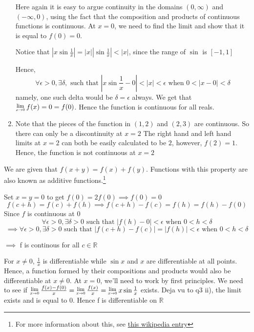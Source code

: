 \documentclass{article}
\newcommand{\Lim}[1]{\raisebox{0.5ex}{\scalebox{0.8}{$\displaystyle \lim_{#1}\;$}}}
\begin{document}
\begin{enumerate}
                            Here again it is easy to argue continuity in the domains $(0, \infty)$ and $(-\infty, 0)$, using the fact that the composition and products of continuous functions is continuous. At $x=0$, we need to find the limit and show that it is equal to $f(0) = 0$.


                            Notice that $|x\sin \frac{1}{x}| = |x||\sin \frac{1}{x}| < |x|$, since the range of $\sin$ is $[-1, 1]$

                            Hence,
                            $$\forall \epsilon>0, \exists \delta,  \text{ such that }|x\sin \frac{1}{x} - 0| < |x| < \epsilon  \text{ when } 0 < |x-0| < \delta$$
                            namely, one such delta would be $\delta = \epsilon$ always. We get that $\Lim{x \to 0} f(x) = 0 = f(0)$. Hence the function is continuous for all reals.
                    \item Note that the pieces of the function in $(1,2)$ and $(2,3)$ are continuous. So there can only be a discontinuity at $x = 2$
                            The right hand and left hand limits at $x = 2$ can both be easily calculated to be $2$, however, $f(2) = 1$. Hence, the function is not continuous at $x=2$
        \end{enumerate}
\item We are given that $f(x+y) = f(x) + f(y)$. Functions with this property are also known as additive functions.\footnote{For more information about this, see \href{https://en.wikipedia.org/wiki/Cauchy\%27s_functional_equation}{this wikipedia entry}}

        Set $x=y=0$ to get $f(0) = 2f(0) \implies f(0) = 0$
$$f(c+h) = f(c) + f(h) \implies f(c+h)-f(c) = f(h) = f(h)-f(0)$$
    Since $f$ is continuous at $0$
    $$ \forall \epsilon>0, \exists \delta>0  \text{ such that }|f(h)-0| < \epsilon  \text{ when } 0 < h < \delta$$
    $$\implies \forall \epsilon>0, \exists \delta>0  \text{ such that } |f(c+h) - f(c)| = |f(h)| < \epsilon\text{ when } 0 < h < \delta$$
    \begin{center}$\implies$ f is continous for all $c \in \mathbb{R}$    

    \end{center}

\item For $x \neq 0$, $\frac{1}{x}$ is differentiable while $\sin x$ and $x$ are differentiable at all points. Hence, a function formed by their compositions and products would also be differentiable at $x \neq 0$. At $x = 0$, we'll need to work by first principles.
        We need to see if $\Lim{x\to 0} \frac{f(x)-f(0)}{x} = \Lim{x\to 0} \frac{f(x)}{x} = \Lim{x\to 0} x\sin \frac{1}{x}$ exists. Deja vu to q3 ii), the limit exists and is equal to 0. Hence f is differentiable on $\mathbb{R}$
\end{document}
